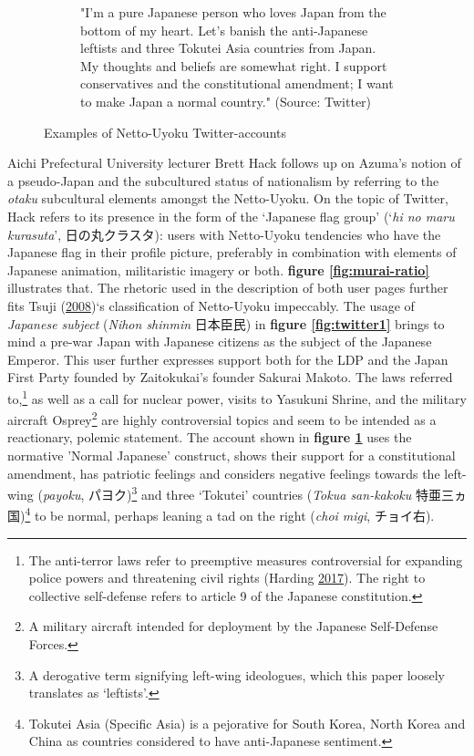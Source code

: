 \documentclass[10pt,british,A4paper,,openany]{memoir}
\begin{document}
\begin{figure}[!htb]
\begin{subfigure}[b]{0.40\textwidth}
  \caption{"I'm a pure Japanese person who loves Japan from the bottom of my heart. Let's banish the anti-Japanese leftists and three Tokutei Asia countries from Japan. My thoughts and beliefs are somewhat right. I support conservatives and the constitutional amendment; I want to make Japan a normal country." (Source: Twitter)}
  \label{fig:twitter2}
 \end{subfigure}
 \caption{Examples of Netto-Uyoku Twitter-accounts}\label{fig:twitter}
\end{figure}

Aichi Prefectural University lecturer Brett Hack follows up on Azuma's
notion of a pseudo-Japan and the subcultured status of nationalism by
referring to the \emph{otaku} subcultural elements amongst the
Netto-Uyoku. On the topic of Twitter, Hack refers to its presence in the
form of the `Japanese flag group' (`\emph{hi no maru kurasuta}',
日の丸クラスタ): users with Netto-Uyoku tendencies who have the Japanese
flag in their profile picture, preferably in combination with elements
of Japanese animation, militaristic imagery or both. \textbf{figure
\ref{fig:murai-ratio}} illustrates that. The rhetoric used in the
description of both user pages further fits Tsuji
(\protect\hyperlink{ref-tsuji_eng:_2008}{2008})`s classification of
Netto-Uyoku impeccably. The usage of \emph{Japanese subject}
(\emph{Nihon shinmin} 日本臣民) in \textbf{figure \ref{fig:twitter1}}
brings to mind a pre-war Japan with Japanese citizens as the subject of
the Japanese Emperor. This user further expresses support both for the
LDP and the Japan First Party founded by Zaitokukai's founder Sakurai
Makoto. The laws referred to,\footnote{The anti-terror laws refer to
  preemptive measures controversial for expanding police powers and
  threatening civil rights (Harding
  \protect\hyperlink{ref-harding_japan_2017}{2017}). The right to
  collective self-defense refers to article 9 of the Japanese
  constitution.} as well as a call for nuclear power, visits to Yasukuni
Shrine, and the military aircraft Osprey\footnote{A military aircraft
  intended for deployment by the Japanese Self-Defense Forces.} are
highly controversial topics and seem to be intended as a reactionary,
polemic statement. The account shown in \textbf{figure
\ref{fig:twitter2}} uses the normative 'Normal Japanese' construct,
shows their support for a constitutional amendment, has patriotic
feelings and considers negative feelings towards the left-wing
(\emph{payoku}, パヨク)\footnote{A derogative term signifying left-wing
  ideologues, which this paper loosely translates as `leftists'.} and
three `Tokutei' countries (\emph{Tokua san-kakoku} 特亜三ヵ国)\footnote{Tokutei
  Asia (Specific Asia) is a pejorative for South Korea, North Korea and
  China as countries considered to have anti-Japanese sentiment.} to be
normal, perhaps leaning a tad on the right (\emph{choi migi}, チョイ右).
\end{document}
